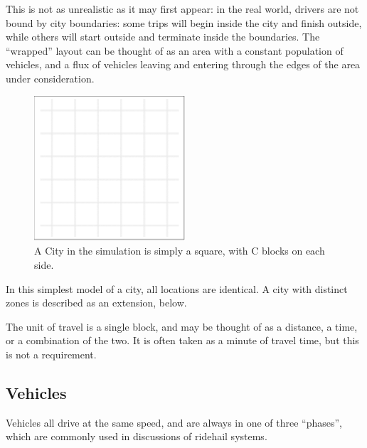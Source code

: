\documentclass[
  letterpaper,
]{article}
\begin{document}
This is not as unrealistic as it may first appear: in the real world,
drivers are not bound by city boundaries: some trips will begin inside
the city and finish outside, while others will start outside and
terminate inside the boundaries. The ``wrapped'' layout can be thought
of as an area with a constant population of vehicles, and a flux of
vehicles leaving and entering through the edges of the area under
consideration.

\begin{figure}

{\centering \includegraphics[width=0.5\textwidth,height=\textheight]{fig1.png}

}

\caption{\label{fig-1}A City in the simulation is simply a square, with
C blocks on each side.}

\end{figure}

In this simplest model of a city, all locations are identical. A city
with distinct zones is described as an extension, below.

The unit of travel is a single block, and may be thought of as a
distance, a time, or a combination of the two. It is often taken as a
minute of travel time, but this is not a requirement.

\hypertarget{vehicles}{%
\subsection{Vehicles}\label{vehicles}}

Vehicles all drive at the same speed, and are always in one of three
``phases'', which are commonly used in discussions of ridehail systems.
\end{document}

